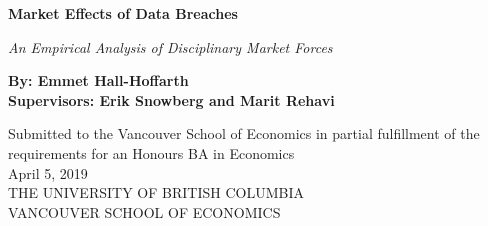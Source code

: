 
\begin{titlepage}
	
	
	\thispagestyle{frontpage}
	
	\begin{center}
		
		\vspace*{1,5\baselineskip}
	
		
		{\Huge \textbf{Market Effects of Data Breaches\\}}
		
		\large{\textit{An Empirical Analysis of Disciplinary Market Forces}}\\
		
        \vspace*{1,5\baselineskip}

		\large{\textbf{By: Emmet Hall-Hoffarth}}\\
		\large{\textbf{Supervisors: Erik Snowberg and Marit Rehavi}}\\
		
		\vspace{1,5\baselineskip}
		
		\large{Submitted to the Vancouver School of Economics in partial fulfillment of the 
requirements for an Honours BA in Economics}\\
    	\large{April 5, 2019}\\
		
		\vspace{1,5\baselineskip}
		\large{THE UNIVERSITY OF BRITISH COLUMBIA}\\
		\large{VANCOUVER SCHOOL OF ECONOMICS}\\

	\end{center}
	
	
\end{titlepage}